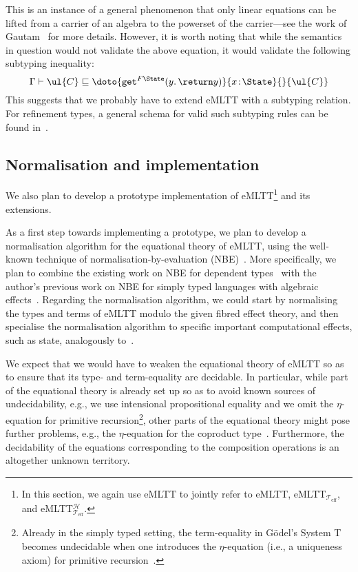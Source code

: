This is an instance of a general phenomenon that only linear equations can be lifted from a carrier of an algebra to the powerset of the carrier---see the work of Gautam~\cite{gautam:validity} for more details. 
However, it is worth noting that while the semantics in question would not validate the above equation, it would validate the following subtyping inequality:
\[
\Gamma \vdash {\ul{C}} \sqsubseteq {\doto {\mathtt{get}^{F\State}(y.\, \return y)} {x \!:\! \State} {} {\ul{C}}}
\]
This suggests that we probably have to extend eMLTT with a subtyping relation. For refinement types, a general schema for valid such subtyping rules can be found in~\cite{Ahman:RefTypes}.


\subsection{Normalisation and implementation}
\label{sect:normalisationandimplementation}

We also plan to develop a prototype implementation of eMLTT\footnote{In this section, we again use eMLTT to jointly refer to eMLTT, eMLTT$_{\mathcal{T}_{\text{eff}}}$, and eMLTT$_{\mathcal{T}_{\text{eff}}}^{\mathcal{H}}$.} and its extensions. 

As a first step towards implementing a prototype, we plan to develop a normalisation algorithm for the equational theory of eMLTT, using the well-known technique of normalisation-by-evaluation (NBE)~\cite{Dybjer:NBE}. More specifically, we plan to combine the existing work on NBE for dependent types~\cite{Altenkirch:NBEforTT} with the author's previous work on NBE for simply typed languages with algebraic effects~\cite{Ahman:NBE}. Regarding the normalisation algorithm, we could start by normalising the types and terms of eMLTT modulo the given fibred effect theory, and then specialise the normalisation algorithm to specific important computational effects, such as state, analogously to~\cite[Section~5.2]{Ahman:NBE}.

We expect that we would have to weaken the equational theory of eMLTT so as to ensure that its type- and term-equality are decidable. In particular, while part of the equational theory is already set up so as to avoid known sources of undecidability, e.g., we use intensional propositional equality and we omit the $\eta$-equation for primitive recursion\footnote{Already in the simply typed setting, the term-equality in G\"{o}del's System T becomes undecidable when one introduces  the $\eta$-equation (i.e., a uniqueness axiom) for primitive recursion~\cite{Okada:Rewriting}.}, other parts of the equational theory might pose further problems, e.g., the $\eta$-equation for the coproduct type~\cite{Balat:NBE}. Furthermore, the decidability of the equations corresponding to the composition operations is an altogether unknown territory. 

